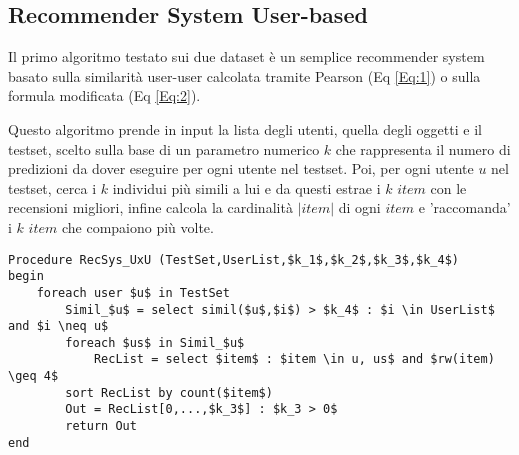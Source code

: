 \documentclass[12pt]{article}
\begin{document}
\subsection{Recommender System User-based}

Il primo algoritmo testato sui due dataset è un semplice recommender system basato sulla similarità user-user calcolata tramite Pearson (Eq \ref{Eq:1}) o sulla formula modificata (Eq \ref{Eq:2}).

Questo algoritmo prende in input la lista degli utenti, quella degli oggetti e il testset, scelto sulla base di un parametro numerico $k$ che rappresenta il numero di predizioni da dover eseguire per ogni utente nel testset. Poi, per ogni utente $u$ nel testset, cerca i $k$ individui più simili a lui e da questi estrae i $k$ $item$ con le recensioni migliori, infine calcola la cardinalità  $|item|$ di ogni $item$ e 'raccomanda' i $k$ $item$ che compaiono più volte.


\begin{lstlisting}
Procedure RecSys_UxU (TestSet,UserList,$k_1$,$k_2$,$k_3$,$k_4$)
begin
	foreach user $u$ in TestSet
		Simil_$u$ = select simil($u$,$i$) > $k_4$ : $i \in UserList$ and $i \neq u$
		foreach $us$ in Simil_$u$
			RecList = select $item$ : $item \in u, us$ and $rw(item) \geq 4$
		sort RecList by count($item$)	
		Out = RecList[0,...,$k_3$] : $k_3 > 0$ 
		return Out
end
\end{lstlisting}
\label{sez:Alg1}

%
%
%
\end{document}

